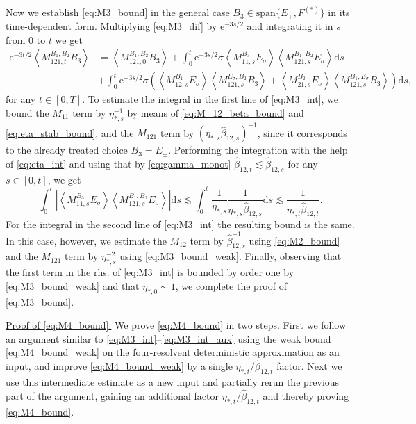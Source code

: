 \documentclass[10pt]{amsart}
\numberwithin{equation}{section}
\newcommand{\dif}{\mathrm{d}}
\newcommand{\ee}{\mathrm{e}}
\begin{document}
Now we establish \eqref{eq:M3_bound} in the general case $B_3\in \mathrm{span}\{E_\pm, F^{(*)}\}$ in its time-dependent form. Multiplying \eqref{eq:M3_dif} by $\ee^{-3s/2}$ and integrating it in $s$ from 0 to $t$ we get
\begin{equation}
\begin{split}
\ee^{-3t/2}\left\langle M_{121,t}^{B_1,B_2}B_3\right\rangle &= \left\langle M_{121,0}^{B_1,B_2}B_3\right\rangle + \int_0^t \ee^{-3s/2} \sigma\left\langle M_{11,s}^{B_3}E_\sigma\right\rangle \left\langle M_{121,s}^{B_1,B_2}E_\sigma\right\rangle\dif s\\
&+\int_0^t \ee^{-3s/2} \sigma\left(\left\langle M_{12,s}^{B_1}E_\sigma\right\rangle \left\langle M_{121,s}^{E_\sigma,B_2}B_3\right\rangle+\left\langle M_{21,s}^{B_2}E_\sigma\right\rangle \left\langle M_{121,s}^{B_1,E_\sigma}B_3\right\rangle\right)\dif s,
\end{split}
\label{eq:M3_int}
\end{equation}
for any $t\in [0,T]$. To estimate the integral in the first line of \eqref{eq:M3_int}, we bound the $M_{11}$ term by $\eta_{*,s}^{-1}$ by means of \eqref{eq:M_12_beta_bound} and \eqref{eq:eta_stab_bound}, and the $M_{121}$ term by $(\eta_{*,s}\widehat{\beta}_{12,s})^{-1}$, since it corresponds to the already treated choice $B_3=E_\pm$. Performing the integration with the help of \eqref{eq:eta_int} and using that by \eqref{eq:gamma_monot} $\widehat{\beta}_{12,t}\lesssim \widehat{\beta}_{12,s}$ for any $s\in [0,t]$, we get
\begin{equation}
\int_0^t \left\vert\left\langle M_{11,s}^{B_3}E_\sigma\right\rangle \left\langle M_{121,s}^{B_1,B_2}E_\sigma\right\rangle\right\vert\dif s\lesssim \int_0^t \frac{1}{\eta_{*,s}}\frac{1}{\eta_{*,s}\widehat{\beta}_{12,s}}\dif s \lesssim \frac{1}{\eta_{*,t}\widehat{\beta}_{12,t}}.
\label{eq:M3_int_aux}
\end{equation}
For the integral in the second line of \eqref{eq:M3_int} the resulting bound is the same. In this case, however, we estimate the $M_{12}$ term by $\widehat{\beta}_{12,s}^{-1}$ using \eqref{eq:M2_bound} and the $M_{121}$ term by $\eta_{*,s}^{-2}$ using \eqref{eq:M3_bound_weak}. Finally, observing that the first term in the rhs. of \eqref{eq:M3_int} is bounded by order one by \eqref{eq:M3_bound_weak} and that $\eta_{*,0}\sim 1$, we complete the proof of \eqref{eq:M3_bound}.


\medskip


\noindent\underline{Proof of \eqref{eq:M4_bound}.} We prove \eqref{eq:M4_bound} in two steps. First we follow an argument similar to \eqref{eq:M3_int}--\eqref{eq:M3_int_aux} using the weak bound \eqref{eq:M4_bound_weak} on the four-resolvent deterministic approximation as an input, and improve \eqref{eq:M4_bound_weak} by a single $\eta_{*,t}/\widehat{\beta}_{12,t}$ factor. Next we use this intermediate estimate as a new input and partially rerun the previous part of the argument, gaining an additional factor $\eta_{*,t}/\widehat{\beta}_{12,t}$ and thereby proving \eqref{eq:M4_bound}.  
\end{document}
